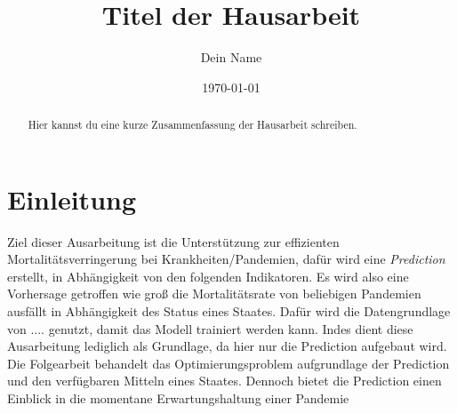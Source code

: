 \documentclass[a4paper,12pt]{article}
\title{Titel der Hausarbeit}
\author{Dein Name}
\date{\today}
\begin{document}
\maketitle

\begin{abstract}
Hier kannst du eine kurze Zusammenfassung der Hausarbeit schreiben.
\end{abstract}

\tableofcontents %

\newpage

\section{Einleitung}
Ziel dieser Ausarbeitung ist die Unterstützung zur effizienten Mortalitätsverringerung bei Krankheiten/Pandemien, dafür
wird eine \textit{Prediction} erstellt, in Abhängigkeit von den folgenden Indikatoren.\newline
Es wird also eine Vorhersage getroffen wie groß die Mortalitätsrate von beliebigen Pandemien ausfällt in Abhängigkeit des
Status eines Staates. Dafür wird die Datengrundlage von .... genutzt, damit das Modell trainiert werden kann.
Indes dient diese Ausarbeitung lediglich als Grundlage, da hier nur die Prediction aufgebaut wird. Die Folgearbeit
behandelt das Optimierungsproblem aufgrundlage der Prediction und den verfügbaren Mitteln eines Staates.\newline
Dennoch bietet die Prediction einen Einblick in die momentane Erwartungshaltung einer Pandemie
\end{document}
